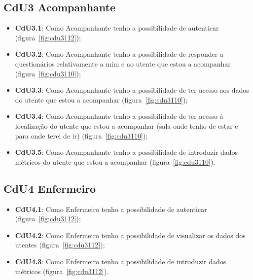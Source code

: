 \subsection{CdU3 Acompanhante}
\begin{minipage}{\linewidth}
\begin{itemize}
	\item \textbf{CdU3.1}: Como Acompanhante tenho a possibilidade de autenticar (figura~\ref{fig:cdu3112});
	\item \textbf{CdU3.2}: Como Acompanhante tenho a possibilidade de responder a questionários relativamente a mim e ao utente que estou a acompanhar (figura~\ref{fig:cdu3110});
	\item \textbf{CdU3.3}: Como Acompanhante tenho a possibilidade de ter acesso aos dados do utente que estou a acompanhar (figura~\ref{fig:cdu3110});
	\item \textbf{CdU3.4}: Como Acompanhante tenho a possibilidade de ter acesso à localização do utente que estou a acompanhar (sala onde tenho de estar e para onde terei de ir) (figura~\ref{fig:cdu3110});
	\item \textbf{CdU3.5}: Como Acompanhante tenho a possibilidade de introduzir dados métricos do utente que estou a acompanhar (figura~\ref{fig:cdu3110}).
\end{itemize}
\end{minipage}
\newline

\subsection{CdU4 Enfermeiro}
\begin{minipage}{\linewidth}
\begin{itemize}
	\item \textbf{CdU4.1}: Como Enfermeiro tenho a possibilidade de autenticar (figura~\ref{fig:cdu3112});
	\item \textbf{CdU4.2}: Como Enfermeiro tenho a possibilidade de visualizar os dados dos utentes (figura~\ref{fig:cdu3112});
	\item \textbf{CdU4.3}: Como Enfermeiro tenho a possibilidade de introduzir dados métricos (figura~\ref{fig:cdu3112}).
\end{itemize}
\end{minipage}
\newline

